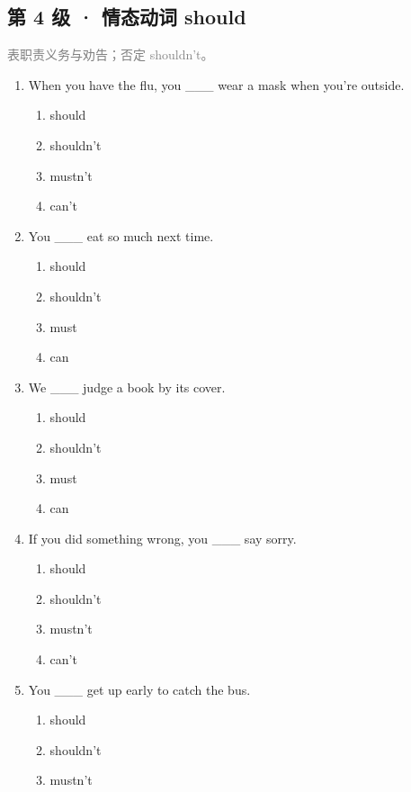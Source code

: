 \documentclass[11pt,a4paper]{ctexart}
\begin{document}
\subsection*{第 4 级 · 情态动词 should}
\noindent\textcolor{gray}{表职责义务与劝告；否定 shouldn’t。}\par\smallskip
\begin{enumerate}[leftmargin=*,itemsep=4pt]
\item When you have the flu, you \_\_\_ wear a mask when you’re outside.
\begin{enumerate}[label=\Alph*.,leftmargin=2em,itemsep=1pt,topsep=2pt]
\item should
\item shouldn’t
\item mustn’t
\item can’t
\end{enumerate}
\item You \_\_\_ eat so much next time.
\begin{enumerate}[label=\Alph*.,leftmargin=2em,itemsep=1pt,topsep=2pt]
\item should
\item shouldn’t
\item must
\item can
\end{enumerate}
\item We \_\_\_ judge a book by its cover.
\begin{enumerate}[label=\Alph*.,leftmargin=2em,itemsep=1pt,topsep=2pt]
\item should
\item shouldn’t
\item must
\item can
\end{enumerate}
\item If you did something wrong, you \_\_\_ say sorry.
\begin{enumerate}[label=\Alph*.,leftmargin=2em,itemsep=1pt,topsep=2pt]
\item should
\item shouldn’t
\item mustn’t
\item can’t
\end{enumerate}
\item You \_\_\_ get up early to catch the bus.
\begin{enumerate}[label=\Alph*.,leftmargin=2em,itemsep=1pt,topsep=2pt]
\item should
\item shouldn’t
\item mustn’t

\end{enumerate}
\end{enumerate}
\end{document}
